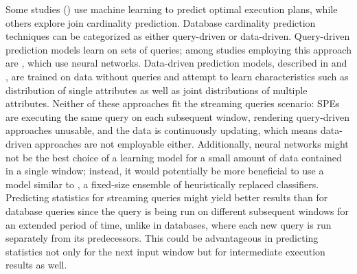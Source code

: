 Some studies (\cite{krishnan2018learning, marcus2019neo}) use machine learning to predict optimal execution plans, while others explore join cardinality prediction. Database cardinality prediction techniques can be categorized as either query-driven or data-driven. Query-driven prediction models learn on sets of queries; among studies employing this approach are \cite{liu2015cardinality, CHEN20211047, kipf2018learned, ortiz2019empirical}, which use neural networks. Data-driven prediction models, described in \cite{hilprecht2020deepdb} and \cite{yang2020neurocard}, are trained on data without queries and attempt to learn characteristics such as distribution of single attributes as well as joint distributions of multiple attributes. Neither of these approaches fit the streaming queries scenario: SPEs are executing the same query on each subsequent window, rendering query-driven approaches unusable, and the data is continuously updating, which means data-driven approaches are not employable either. Additionally, neural networks might not be the best choice of a learning model for a small amount of data contained in a single window; instead, it would potentially be more beneficial to use a model similar to \cite{street2001ensemble}, a fixed-size ensemble of heuristically replaced classifiers. Predicting statistics for streaming queries might yield better results than for database queries since the query is being run on different subsequent windows for an extended period of time, unlike in databases, where each new query is run separately from its predecessors. This could be advantageous in predicting statistics not only for the next input window but for intermediate execution results as well.











